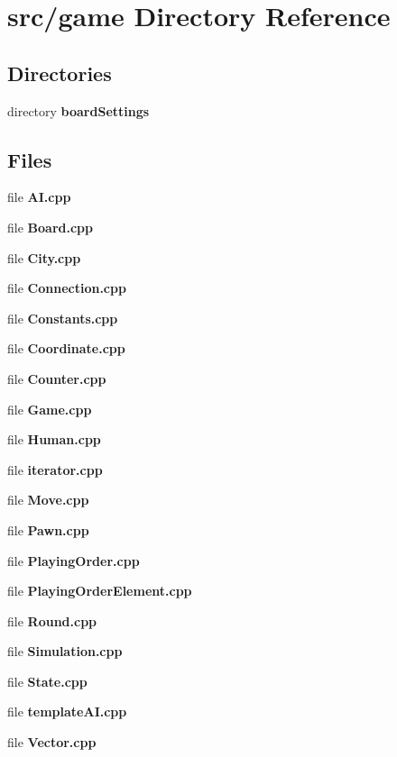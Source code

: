 \section{src/game Directory Reference}
\label{dir_1699be727a800b1d059c6f7f2b91d2ee}
\subsection*{Directories}
\begin{DoxyCompactItemize}
\item 
directory {\bf board\-Settings}
\end{DoxyCompactItemize}
\subsection*{Files}
\begin{DoxyCompactItemize}
\item 
file {\bfseries A\-I.\-cpp}
\item 
file {\bfseries Board.\-cpp}
\item 
file {\bfseries City.\-cpp}
\item 
file {\bfseries Connection.\-cpp}
\item 
file {\bfseries Constants.\-cpp}
\item 
file {\bfseries Coordinate.\-cpp}
\item 
file {\bfseries Counter.\-cpp}
\item 
file {\bfseries Game.\-cpp}
\item 
file {\bfseries Human.\-cpp}
\item 
file {\bfseries iterator.\-cpp}
\item 
file {\bfseries Move.\-cpp}
\item 
file {\bfseries Pawn.\-cpp}
\item 
file {\bfseries Playing\-Order.\-cpp}
\item 
file {\bfseries Playing\-Order\-Element.\-cpp}
\item 
file {\bfseries Round.\-cpp}
\item 
file {\bfseries Simulation.\-cpp}
\item 
file {\bfseries State.\-cpp}
\item 
file {\bfseries template\-A\-I.\-cpp}
\item 
file {\bfseries Vector.\-cpp}
\end{DoxyCompactItemize}
